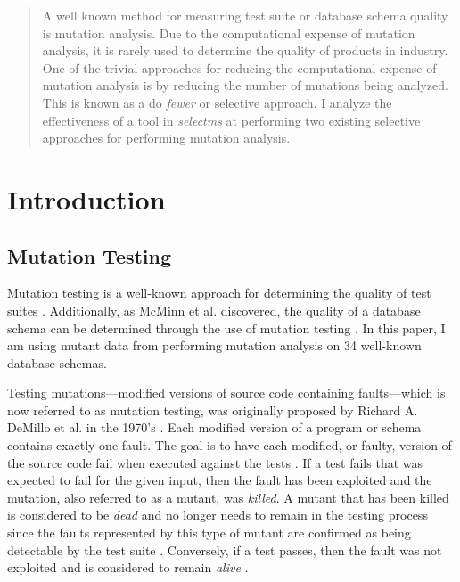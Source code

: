 \documentclass[conference]{IEEEtran}
\begin{document}
\begin{abstract}
    A well known method for measuring test suite or database schema quality is mutation analysis.
    Due to the computational expense of mutation analysis, it is
    rarely used to determine the quality of products in industry. One
    of the trivial approaches for reducing the computational expense of
    mutation analysis is by reducing the number of mutations being analyzed.
    This is known as a do \textit{fewer} or selective approach. I analyze the effectiveness
    of a tool in \textit{selectms} at performing two existing selective approaches for
    performing mutation analysis.
\end{abstract}

%
\IEEEpeerreviewmaketitle

\section{Introduction}
\subsection{Mutation Testing}

Mutation testing is a well-known approach for determining the quality of test
suites \cite{gopinath2015empirical}. Additionally, as McMinn et al. discovered, the quality of a database schema
can be determined through the use of mutation testing \cite{mcminn2015effectiveness}. In
this paper, I am using mutant data from performing mutation analysis on 34 well-known database schemas.

Testing mutations---modified versions of source code containing faults---which is now
referred to as mutation testing, was originally proposed by Richard A. DeMillo et al.
in the 1970's \cite{demillo1978hints}. Each modified version of a program or schema contains
exactly one fault. The goal is to have each modified, or faulty, version of the source code
fail when executed against the tests \cite{offutt1993experimental}. If a test fails that was expected to fail
for the given input, then the fault has been exploited and the mutation, also referred to as a mutant,
was \textit{killed}. A mutant that has been killed is considered to be \textit{dead} and no
longer needs to remain in the testing process since the faults represented by this type of
mutant are confirmed as being detectable by the test suite \cite{offutt1993experimental}.
Conversely, if a test passes, then the fault was not exploited and is considered to remain
\textit{alive} \cite{mcminnvirtual}.
\end{document}
